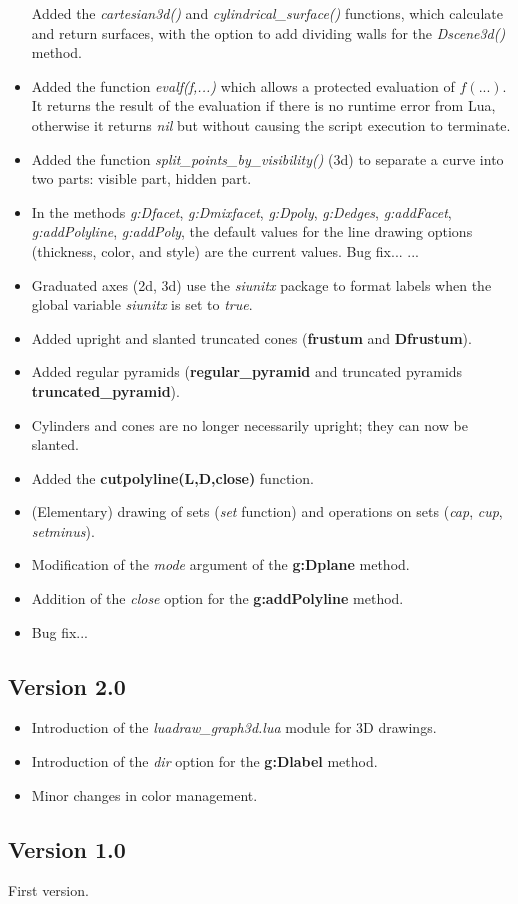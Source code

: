 \begin{itemize}
Added the \emph{cartesian3d()} and \emph{cylindrical\_surface()} functions, which calculate and return surfaces, with the option to add dividing walls for the \emph{Dscene3d()} method.     \item Added the function \emph{evalf(f,...)} which allows a protected evaluation of $f(...)$. It returns the result of the evaluation if there is no runtime error from Lua, otherwise it returns \emph{nil} but without causing the script execution to terminate.
    \item Added the function \emph{split\_points\_by\_visibility()} (3d) to separate a curve into two parts: visible part, hidden part.
    \item In the methods \emph{g:Dfacet}, \emph{g:Dmixfacet}, \emph{g:Dpoly}, \emph{g:Dedges}, \emph{g:addFacet}, \emph{g:addPolyline}, \emph{g:addPoly}, the default values ​​for the line drawing options (thickness, color, and style) are the current values.
Bug fix...
...     \item Graduated axes (2d, 3d) use the \emph{siunitx} package to format labels when the global variable \emph{siunitx} is set to \emph{true}.
    \item Added upright and slanted truncated cones (\textbf{frustum} and \textbf{Dfrustum}).
    \item Added regular pyramids (\textbf{regular\_pyramid} and truncated pyramids \textbf{truncated\_pyramid}).
    \item Cylinders and cones are no longer necessarily upright; they can now be slanted.
    \item Added the \textbf{cutpolyline(L,D,close)} function.
    \item (Elementary) drawing of sets (\emph{set} function) and operations on sets (\emph{cap}, \emph{cup}, \emph{setminus}).
    \item Modification of the \emph{mode} argument of the \textbf{g:Dplane} method.
    \item Addition of the \emph{close} option for the \textbf{g:addPolyline} method.
    \item Bug fix...
\end{itemize}

\subsection{Version 2.0}

\begin{itemize}
    \item Introduction of the \emph{luadraw\_graph3d.lua} module for 3D drawings.
    \item Introduction of the \emph{dir} option for the \textbf{g:Dlabel} method.
    \item Minor changes in color management.
\end{itemize}

\subsection{Version 1.0}
First version.
